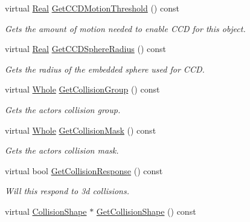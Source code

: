 \begin{DoxyCompactItemize}
virtual \hyperlink{namespaceMezzanine_a726731b1a7df72bf3583e4a97282c6f6}{Real} \hyperlink{classMezzanine_1_1ActorBasePhysicsSettings_a804941eb77d960dd3c73d331c47c891c}{GetCCDMotionThreshold} () const 
\begin{DoxyCompactList}\small\item\em Gets the amount of motion needed to enable CCD for this object. \item\end{DoxyCompactList}\item 
virtual \hyperlink{namespaceMezzanine_a726731b1a7df72bf3583e4a97282c6f6}{Real} \hyperlink{classMezzanine_1_1ActorBasePhysicsSettings_a3729e8ee88bc2d8892d921016aa4a4c0}{GetCCDSphereRadius} () const 
\begin{DoxyCompactList}\small\item\em Gets the radius of the embedded sphere used for CCD. \item\end{DoxyCompactList}\item 
virtual \hyperlink{namespaceMezzanine_adcbb6ce6d1eb4379d109e51171e2e493}{Whole} \hyperlink{classMezzanine_1_1ActorBasePhysicsSettings_af231c0c7f3cf41152bba1300821b0a59}{GetCollisionGroup} () const 
\begin{DoxyCompactList}\small\item\em Gets the actors collision group. \item\end{DoxyCompactList}\item 
virtual \hyperlink{namespaceMezzanine_adcbb6ce6d1eb4379d109e51171e2e493}{Whole} \hyperlink{classMezzanine_1_1ActorBasePhysicsSettings_ada732a441b7745646d7620fbf896ed77}{GetCollisionMask} () const 
\begin{DoxyCompactList}\small\item\em Gets the actors collision mask. \item\end{DoxyCompactList}\item 
virtual bool \hyperlink{classMezzanine_1_1ActorBasePhysicsSettings_a2a3e99a0b473cd77b6ed7648faca1f0f}{GetCollisionResponse} () const 
\begin{DoxyCompactList}\small\item\em Will this respond to 3d collisions. \item\end{DoxyCompactList}\item 
virtual \hyperlink{classMezzanine_1_1CollisionShape}{CollisionShape} $\ast$ \hyperlink{classMezzanine_1_1ActorBasePhysicsSettings_af19829d769ba0723bb6c190e28b6184e}{GetCollisionShape} () const 

\end{DoxyCompactItemize}

